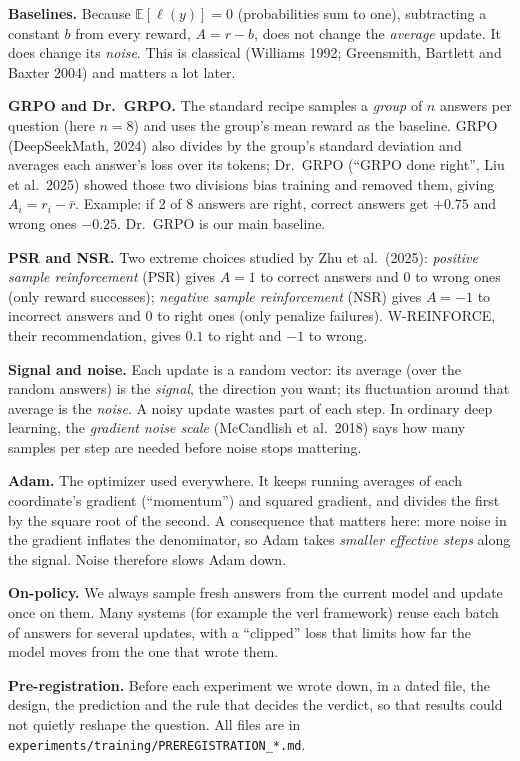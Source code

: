 \documentclass[11pt]{article}
\newcommand{\E}{\mathbb{E}}
\begin{document}
\textbf{Baselines.} Because $\E[\ell(y)]=0$ (probabilities sum to one), subtracting a constant $b$ from every reward, $A=r-b$, does not change the \emph{average} update. It does change its \emph{noise}. This is classical (Williams 1992; Greensmith, Bartlett and Baxter 2004) and matters a lot later.

\textbf{GRPO and Dr.\ GRPO.} The standard recipe samples a \emph{group} of $n$ answers per question (here $n=8$) and uses the group's mean reward as the baseline. GRPO (DeepSeekMath, 2024) also divides by the group's standard deviation and averages each answer's loss over its tokens; Dr.\ GRPO (``GRPO done right'', Liu et al.\ 2025) showed those two divisions bias training and removed them, giving $A_i=r_i-\bar r$. Example: if 2 of 8 answers are right, correct answers get $+0.75$ and wrong ones $-0.25$. Dr.\ GRPO is our main baseline.

\textbf{PSR and NSR.} Two extreme choices studied by Zhu et al.\ (2025): \emph{positive sample reinforcement} (PSR) gives $A=1$ to correct answers and $0$ to wrong ones (only reward successes); \emph{negative sample reinforcement} (NSR) gives $A=-1$ to incorrect answers and $0$ to right ones (only penalize failures). W-REINFORCE, their recommendation, gives $0.1$ to right and $-1$ to wrong.

\textbf{Signal and noise.} Each update is a random vector: its average (over the random answers) is the \emph{signal}, the direction you want; its fluctuation around that average is the \emph{noise}. A noisy update wastes part of each step. In ordinary deep learning, the \emph{gradient noise scale} (McCandlish et al.\ 2018) says how many samples per step are needed before noise stops mattering.

\textbf{Adam.} The optimizer used everywhere. It keeps running averages of each coordinate's gradient (``momentum'') and squared gradient, and divides the first by the square root of the second. A consequence that matters here: more noise in the gradient inflates the denominator, so Adam takes \emph{smaller effective steps} along the signal. Noise therefore slows Adam down.

\textbf{On-policy.} We always sample fresh answers from the current model and update once on them. Many systems (for example the verl framework) reuse each batch of answers for several updates, with a ``clipped'' loss that limits how far the model moves from the one that wrote them.

\textbf{Pre-registration.} Before each experiment we wrote down, in a dated file, the design, the prediction and the rule that decides the verdict, so that results could not quietly reshape the question. All files are in \texttt{experiments/training/PREREGISTRATION\_*.md}.
\end{document}
